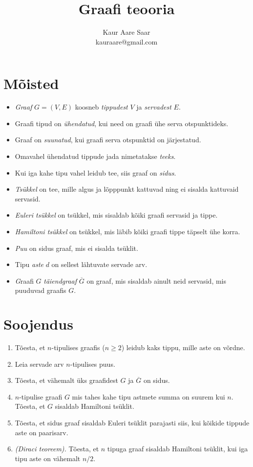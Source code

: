 \documentclass{article}
\title{Graafi teooria}
\author{Kaur Aare Saar \\ kauraare@gmail.com}
\begin{document}
	\maketitle
	\section{Mõisted}
	\begin{itemize}
		\item
		\emph{Graaf} $G=(V,E)$ koosneb \emph{tippudest} $V$ ja \emph{servadest} $E$.
		\item
		Graafi tipud on \emph{ühendatud}, kui need on graafi ühe serva otspunktideks.
		\item
		Graaf on \emph{suunatud}, kui graafi serva otspunktid on järjestatud.
		\item
		Omavahel ühendatud tippude jada nimetatakse \emph{teeks}.
		\item
		Kui iga kahe tipu vahel leidub tee, siis graaf on \emph{sidus}.
		\item
		\emph{Tsükkel} on tee, mille algus ja lõpppunkt kattuvad ning ei sisalda kattuvaid servasid.
		\item
		\emph{Euleri tsükkel} on tsükkel, mis sisaldab kõiki graafi servasid ja tippe.
		\item
		\emph{Hamiltoni tsükkel} on tsükkel, mis läbib kõiki graafi tippe täpselt ühe korra.
		\item
		\emph{Puu} on sidus graaf, mis ei sisalda tsüklit.
		\item
		Tipu \emph{aste} $d$ on sellest lähtuvate servade arv.
		\item
		\emph Graafi $G$ \emph{täiendgraaf} $\overline{G}$ on graaf, mis sisaldab ainult neid servasid, mis puuduvad graafis $G$.
		 
		
		
	\end{itemize}

	\section{Soojendus}
	\begin{enumerate}
		\item
		Tõesta, et $n$-tipulises graafis ($n\geq 2$) leidub kaks tippu, mille aste on võrdne.	
		\item
		Leia servade arv $n$-tipulises puus.
		\item
		Tõesta, et vähemalt üks graafidest $G$ ja $\overline{G}$ on sidus.	
		\item
		$n$-tipulise graafi $G$ mis tahes kahe tipu astmete summa on suurem kui $n$. Tõesta, et $G$ sisaldab Hamiltoni tsüklit.	
		\item
		Tõesta, et sidus graaf sisaldab Euleri tsüklit parajasti siis, kui kõikide tippude aste on paarisarv.
		\item
		\emph{(Diraci teoreem).} Tõesta, et $n$ tipuga graaf sisaldab Hamiltoni tsüklit, kui iga tipu aste on vähemalt $n/2$.
		
	\end{enumerate}
\end{document}
